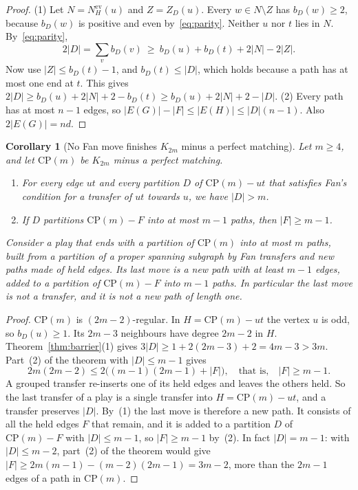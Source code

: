 \documentclass[11pt]{amsart}
\newtheorem{corollary}[theorem]{Corollary}
\theoremstyle{definition}
\begin{document}
\begin{proof}
(1) Let $N=N^{\mathrm{ev}}_H(u)$ and $Z=Z_D(u)$. Every $w\in N\setminus Z$ has $b_D(w)\ge2$, because
$b_D(w)$ is positive and even by~\eqref{eq:parity}. Neither $u$ nor $t$ lies in $N$. By~\eqref{eq:parity},
\[
2|D|=\sum_v b_D(v)\ \ge\ b_D(u)+b_D(t)+2|N|-2|Z|.
\]
Now use $|Z|\le b_D(t)-1$, and $b_D(t)\le|D|$, which holds because a path has at most one end at $t$.
This gives $2|D|\ge b_D(u)+2|N|+2-b_D(t)\ge b_D(u)+2|N|+2-|D|$.
(2) Every path has at most $n-1$ edges, so $|E(G)|-|F|\le|E(H)|\le|D|(n-1)$. Also $2|E(G)|=nd$.
\end{proof}

\begin{corollary}[No Fan move finishes $K_{2m}$ minus a perfect matching]\label{cor:cp}
Let $m\ge4$, and let $\mathrm{CP}(m)$ be $K_{2m}$ minus a perfect matching.
\begin{enumerate}
\item For every edge $ut$ and every partition $D$ of $\mathrm{CP}(m)-ut$ that satisfies Fan's condition
for a transfer of $ut$ towards $u$, we have $|D|>m$.
\item If $D$ partitions $\mathrm{CP}(m)-F$ into at most $m-1$ paths, then $|F|\ge m-1$.
\end{enumerate}
Consider a play that ends with a partition of $\mathrm{CP}(m)$ into at most $m$ paths, built from a
partition of a proper spanning subgraph by Fan transfers and new paths made of held edges. Its last
move is a new path with at least $m-1$ edges, added to a partition of $\mathrm{CP}(m)-F$ into $m-1$
paths. In particular the last move is not a transfer, and it is not a new path of length one.
\end{corollary}

\begin{proof}
$\mathrm{CP}(m)$ is $(2m-2)$-regular. In $H=\mathrm{CP}(m)-ut$ the vertex $u$ is odd, so $b_D(u)\ge1$.
Its $2m-3$ neighbours have degree $2m-2$ in $H$. Theorem~\ref{thm:barrier}(1) gives
$3|D|\ge 1+2(2m-3)+2=4m-3>3m$. Part~(2) of the theorem with $|D|\le m-1$ gives
\[
2m(2m-2)\le 2\bigl((m-1)(2m-1)+|F|\bigr),\quad\text{that is,}\quad |F|\ge m-1.
\]
A grouped transfer re-inserts one of its held edges and leaves the others held. So the last transfer
of a play is a single transfer into $H=\mathrm{CP}(m)-ut$, and a transfer preserves $|D|$. By~(1)
the last move is therefore a new path. It consists of all the held edges $F$ that remain, and it is
added to a partition $D$ of $\mathrm{CP}(m)-F$ with $|D|\le m-1$, so $|F|\ge m-1$ by~(2). In fact
$|D|=m-1$: with $|D|\le m-2$, part~(2) of the theorem would give
$|F|\ge 2m(m-1)-(m-2)(2m-1)=3m-2$, more than the $2m-1$ edges of a path in $\mathrm{CP}(m)$.
\end{proof}
\end{document}
